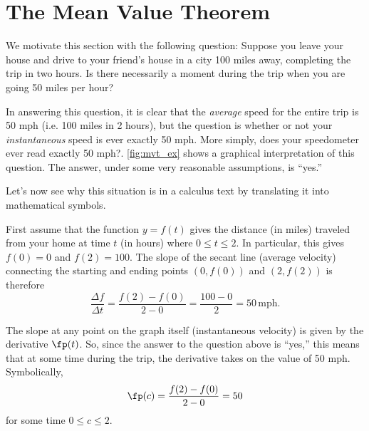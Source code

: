 \section{The Mean Value Theorem}\label{sec:mvt}

We motivate this section with the following question: Suppose you leave your house and drive to your friend's house in a city 100 miles away, completing the trip in two hours.  Is there necessarily a moment during the trip when you are going 50 miles per hour?

In answering this question, it is clear that the \emph{average} speed for the entire trip is 50 mph (i.e. 100 miles in 2 hours), but the question is whether or not your \emph{instantaneous} speed is ever exactly 50 mph. More simply, does your speedometer ever read exactly 50 mph?.  \autoref{fig:mvt_ex} shows a graphical interpretation of this question.  The answer, under some very reasonable assumptions, is ``yes.''


Let's now see why this situation is in a calculus text by translating it into mathematical symbols.\bigbreak

First assume that the function $y = f(t)$ gives the distance (in miles) traveled from your home at time $t$ (in hours) where $0\le t\le 2$.  In particular, this gives $f(0)=0$ and $f(2)=100$.  The slope of the secant line (average velocity) connecting the starting and ending points $(0,f(0))$ and $(2,f(2))$ is therefore 
\[
\frac{\Delta f}{\Delta t} = \frac{f(2)-f(0)}{2-0} = \frac{100-0}{2} = 50 \, \text{mph}.
\]

The slope at any point on the graph itself (instantaneous velocity) is given by the derivative $\fp(t)$.  So, since the answer to the question above is ``yes,'' this means that at some time during the trip, the derivative takes on the value of 50 mph.  Symbolically, 
\[\fp(c) = \frac{f(2)-f(0)}{2-0} = 50\]
for some time $0\le c \le 2.$\bigskip

